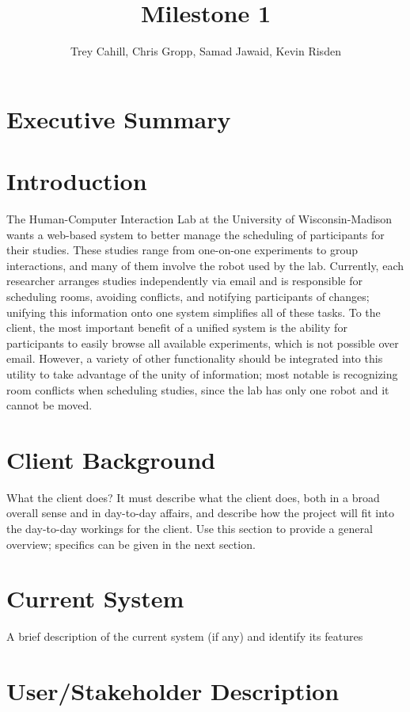 \documentclass{article}
\title{Milestone 1}
\author{Trey Cahill, Chris Gropp, Samad Jawaid, Kevin Risden}
\begin{document}
\maketitle
\section{Executive Summary}
\section{Introduction}
The Human-Computer Interaction Lab at the University of Wisconsin-Madison wants a web-based system to better manage the scheduling of participants for their studies.  These studies range from one-on-one experiments to group interactions, and many of them involve the robot used by the lab.  Currently, each researcher arranges studies independently via email and is responsible for scheduling rooms, avoiding conflicts, and notifying participants of changes; unifying this information onto one system simplifies all of these tasks.  To the client, the most important benefit of a unified system is the ability for participants to easily browse all available experiments, which is not possible over email.  However, a variety of other functionality should be integrated into this utility to take advantage of the unity of information; most notable is recognizing room conflicts when scheduling studies, since the lab has only one robot and it cannot be moved.

\section{Client Background}
What the client does? It must describe what the client does, both in a broad overall sense and in day-to-day affairs, and describe how the project will fit into the day-to-day workings for the client. Use this section to provide a general overview; specifics can be given in the next section.

\section{Current System}
A brief description of the current system (if any) and identify its features

\section{User/Stakeholder Description}
\end{document}
